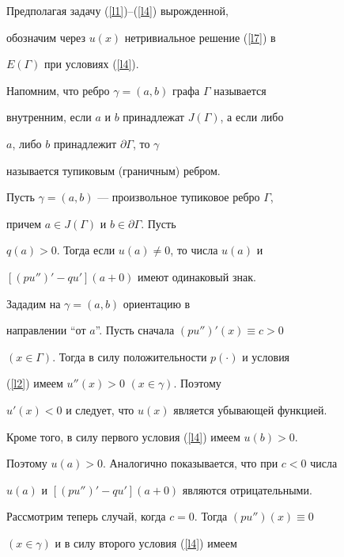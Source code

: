 {{{{{{{Предполагая задачу (\ref{l1})--(\ref{l4}) вырожденной,


обозначим через $u(x)$ нетривиальное решение (\ref{l7}) в


$E(\Gamma)$ при условиях (\ref{l4}).





Напомним, что ребро $\gamma=(a,b)$ графа $\Gamma$ называется


внутренним, если $a$ и $b$ принадлежат $J(\Gamma)$, а если либо


$a$, либо $b$ принадлежит $\partial \Gamma$, то $\gamma$


называется тупиковым (граничным) ребром.





\begin{lem}


Пусть $\gamma=(a,b)$ --- произвольное тупиковое ребро $\Gamma$,


причем $a \in J(\Gamma)$ и $b \in \partial \Gamma$. Пусть


$q(a)>0$. Тогда если $u(a)\ne 0$, то числа $u(a)$ и


$[(pu'')'-qu'](a+0)$ имеют одинаковый знак.


\end{lem}





\begin{pf}


Зададим на $\gamma=(a,b)$ ориентацию в


направлении ``от $a$''. Пусть сначала $(pu'')'(x)\equiv c>0$


$(x\in\Gamma)$. Тогда в силу положительности $p(\cdot)$ и условия


(\ref{l2}) имеем $u''(x)>0$ $(x\in\gamma)$. Поэтому


$u'(x)<0$ и следует, что $u(x)$ является убывающей функцией.


Кроме того, в силу первого условия (\ref{l4}) имеем $u(b)>0$.


Поэтому $u(a)>0$. Аналогично показывается, что при $c<0 $ числа


$u(a)$ и $[(pu'')'-qu'](a+0)$ являются отрицательными.





Рассмотрим теперь случай, когда $c=0$. Тогда $(pu'')(x)\equiv 0$


$(x\in \gamma)$ и в силу второго условия (\ref{l4}) имеем



\end{pf}}}}}}}}

